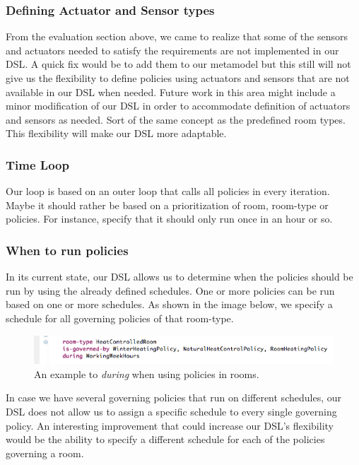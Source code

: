 \documentclass{llncs}
\begin{document}
\subsubsection{Defining Actuator and Sensor types}\label{subsec:def-sensor-actuator-types}
From the evaluation section above, we came to realize that some of the sensors and actuators needed to satisfy the requirements are not implemented in our DSL. A quick fix would be to add them to our metamodel but this still will not give us the flexibility to define policies using actuators and sensors that are not available in our DSL when needed. Future work in this area might include a minor modification of our DSL in order to accommodate definition of actuators and sensors as needed. Sort of the same concept as the predefined room types. This flexibility will make our DSL more adaptable.


\subsubsection{Time Loop}\label{subsec:looptime}
Our loop is based on an outer loop that calls all policies in every iteration. Maybe it should rather be based on a prioritization of room, room-type or policies. For instance, specify that it should only run once in an hour or so.

\subsubsection{When to run policies}\label{subsec:during}
In its current state, our DSL allows us to determine when the policies should be run by using the already defined schedules. One or more policies can be run based on one or more schedules. As shown in the image below, we specify a schedule for all governing policies of that room-type. 
\begin{figure}
  \centering
    \includegraphics[scale=0.5]{dsl-during.png} 
	\caption{An example to \textit{during} when using policies in rooms.}
	\label{fig:during}
\end{figure}
In case we have several governing policies that run on different schedules, our DSL does not allow us to assign a specific schedule to every single governing policy. An interesting improvement that could increase our DSL's flexibility would be the ability to specify a different schedule for each of the policies governing a room. 
\end{document}
